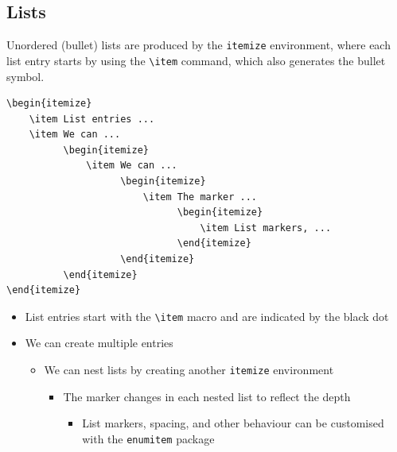 \documentclass[11pt, twoside]{article}
\begin{document}
\subsection{Lists}
Unordered (bullet) lists are produced by the \lstinline{itemize} environment,
where each list entry starts by using the \lstinline{\item} command, which
also generates the bullet symbol.
\begin{lstlisting}
\begin{itemize}
    \item List entries ...
    \item We can ...
          \begin{itemize}
              \item We can ...
                    \begin{itemize}
                        \item The marker ...
                              \begin{itemize}
                                  \item List markers, ...
                              \end{itemize}
                    \end{itemize}
          \end{itemize}
\end{itemize}
\end{lstlisting}
\begin{itemize}
    \item List entries start with the \lstinline{\item} macro and are indicated by the black dot
    \item We can create multiple entries
          \begin{itemize}
              \item We can nest lists by creating another \lstinline{itemize} environment
                    \begin{itemize}
                        \item The marker changes in each nested list to reflect the depth
                              \begin{itemize}
                                  \item List markers, spacing, and other behaviour can be customised with the \lstinline{enumitem} package
                              \end{itemize}
                    \end{itemize}
          \end{itemize}
\end{itemize}
\end{document}
